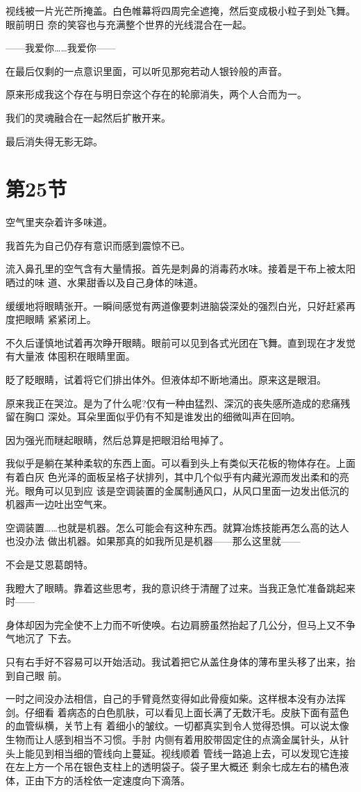\documentclass[11pt]{book}
\begin{document}
视线被一片光芒所掩盖。白色帷幕将四周完全遮掩，然后变成极小粒子到处飞舞。眼前明日
奈的笑容也与充满整个世界的光线混合在一起。

——我爱你……我爱你——

在最后仅剩的一点意识里面，可以听见那宛若动人银铃般的声音。

原来形成我这个存在与明日奈这个存在的轮廓消失，两个人合而为一。

我们的灵魂融合在一起然后扩散开来。

最后消失得无影无踪。
\section{第25节}
\label{sec:orge9b0f16}
空气里夹杂着许多味道。

我首先为自己仍存有意识而感到震惊不已。

流入鼻孔里的空气含有大量情报。首先是刺鼻的消毒药水味。接着是干布上被太阳晒过的味
道、水果甜香以及自己身体的味道。

缓缓地将眼睛张开。一瞬间感觉有两道像要刺进脑袋深处的强烈白光，只好赶紧再度把眼睛
紧紧闭上。

不久后谨慎地试着再次睁开眼睛。眼前可以见到各式光团在飞舞。直到现在才发觉有大量液
体囤积在眼睛里面。

眨了眨眼睛，试着将它们排出体外。但液体却不断地涌出。原来这是眼泪。

原来我正在哭泣。是为了什么呢?仅有一种由猛烈、深沉的丧失感所造成的悲痛残留在胸口
深处。耳朵里面似乎仍有不知是谁发出的细微叫声在回响。

因为强光而瞇起眼睛，然后总算是把眼泪给甩掉了。

我似乎是躺在某种柔软的东西上面。可以看到头上有类似天花板的物体存在。上面有着白灰
色光泽的面板呈格子状排列，其中几个似乎有内藏光源而发出柔和的亮光。眼角可以见到应
该是空调装置的金属制通风口，从风口里面一边发出低沉的机器声一边吐出空气来。

空调装置……也就是机器。怎么可能会有这种东西。就算冶炼技能再怎么高的达人也没办法
做出机器。如果那真的如我所见是机器——那么这里就——

不会是艾恩葛朗特。

我瞪大了眼睛。靠着这些思考，我的意识终于清醒了过来。当我正急忙准备跳起来时——

身体却因为完全使不上力而不听使唤。右边肩膀虽然抬起了几公分，但马上又不争气地沉了
下去。

只有右手好不容易可以开始活动。我试着把它从盖住身体的薄布里头移了出来，抬到自己眼
前。

一时之间没办法相信，自己的手臂竟然变得如此骨瘦如柴。这样根本没有办法挥剑。仔细看
着病态的白色肌肤，可以看见上面长满了无数汗毛。皮肤下面有蓝色的血管纵横，关节上有
着细小的皱纹。一切都真实到令人觉得恐惧。可以说太像生物而让人感到相当不习惯。手肘
内侧有着用胶带固定住的点滴金属针头，从针头上能见到相当细的管线向上蔓延。视线顺着
管线一路追上去，可以发现它连接在左上方一个吊在银色支柱上的透明袋子。袋子里大概还
剩余七成左右的橘色液体，正由下方的活栓依一定速度向下滴落。
\end{document}
